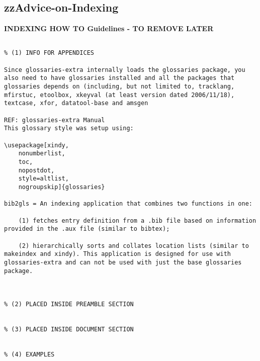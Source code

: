 \pagebreak
\begin{tcolorbox}

\section{zzAdvice-on-Indexing}





\textbf{INDEXING HOW TO Guidelines - TO REMOVE LATER}	

\begin{lstlisting}[caption={zzAdvice-on-Indexing}, label=zzAdvice-on-Indexing]

% (1) INFO FOR APPENDICES

Since glossaries-extra internally loads the glossaries package, you also need to have glossaries installed and all the packages that glossaries depends on (including, but not limited to, tracklang, mfirstuc, etoolbox, xkeyval (at least version dated 2006/11/18), textcase, xfor, datatool-base and amsgen

REF: glossaries-extra Manual
This glossary style was setup using:

\usepackage[xindy,
	nonumberlist,
	toc,
	nopostdot,
	style=altlist,
	nogroupskip]{glossaries}

bib2gls = An indexing application that combines two functions in one: 

	(1) fetches entry definition from a .bib file based on information provided in the .aux file (similar to bibtex); 
	
	(2) hierarchically sorts and collates location lists (similar to makeindex and xindy). This application is designed for use with glossaries-extra and can not be used with just the base glossaries package.



% (2) PLACED INSIDE PREAMBLE SECTION


% (3) PLACED INSIDE DOCUMENT SECTION


% (4) EXAMPLES


\end{lstlisting}
\end{tcolorbox}
